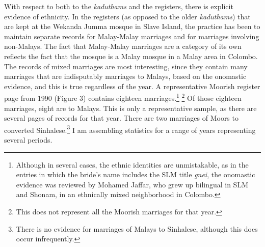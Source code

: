 \normalsize
With respect to both to the \textit{kaduthams} and the registers, there is explicit evidence of ethnicity.  In the registers (as opposed to the older \textit{kaduthams}) that are kept at the Wekanda Jumma mosque in Slave Island, the practice has been to maintain separate records for Malay-Malay marriages and for marriages involving non-Malays. The fact that Malay-Malay marriages are a category of its own reflects the fact that the mosque is a Malay mosque in a Malay area in Colombo. The records of mixed marriages are most interesting, since they contain many marriages that are indisputably marriages to Malays, based on the onomastic evidence, and this is true regardless of the year. A representative Moorish register page from 1990 (Figure 3) contains eighteen marriages.\footnote{Although
  in several cases, the ethnic identities are unmistakable, as in the entries in which the bride's name includes the SLM title \textit{gnei}, the onomastic evidence was reviewed by Mohamed Jaffar, who grew up bilingual in SLM and Shonam, in an ethnically mixed neighborhood in Colombo.
} 
\footnote{This
  does not represent all the Moorish marriages for that year.
} 
Of those eighteen marriages, eight are to Malays. This is only a representative sample, as there are several pages of records for that year. There are two marriages of Moors to converted Sinhalese.\footnote{There
  is no evidence for marriages of Malays to Sinhalese, although this does occur infrequently.
}  
I am assembling statistics for a range of years representing several periods.

